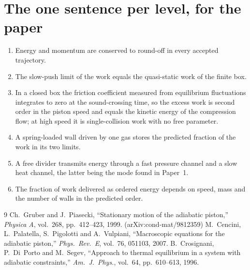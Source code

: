 \documentclass[11pt,a4paper]{article}
\begin{document}
\section*{The one sentence per level, for the paper}
\begin{enumerate}[nosep]
\item[0.] Energy and momentum are conserved to round-off in every accepted trajectory.
\item[1.] The slow-push limit of the work equals the quasi-static work of the finite box.
\item[2.] In a closed box the friction coefficient measured from equilibrium fluctuations integrates to zero at the sound-crossing time, so the excess work is second order in the piston speed and equals the kinetic energy of the compression flow; at high speed it is single-collision work with no free parameter.
\item[3.] A spring-loaded wall driven by one gas stores the predicted fraction of the work in its two limits.
\item[4.] A free divider transmits energy through a fast pressure channel and a slow heat channel, the latter being the mode found in Paper~1.
\item[5.] The fraction of work delivered as ordered energy depends on speed, mass and the number of walls in the predicted order.
\end{enumerate}


\begin{thebibliography}{9}
 Ch.~Gruber and J.~Piasecki, ``Stationary motion of the adiabatic piston,''
\emph{Physica A}, vol.~268, pp.~412--423, 1999. (arXiv:cond-mat/9812359)
 M.~Cencini, L.~Palatella, S.~Pigolotti and A.~Vulpiani, ``Macroscopic
equations for the adiabatic piston,'' \emph{Phys.\ Rev.\ E}, vol.~76, 051103, 2007.
 B.~Crosignani, P.~Di~Porto and M.~Segev, ``Approach to thermal equilibrium
in a system with adiabatic constraints,'' \emph{Am.\ J.\ Phys.}, vol.~64, pp.~610--613, 1996.
\end{thebibliography}
\end{document}
